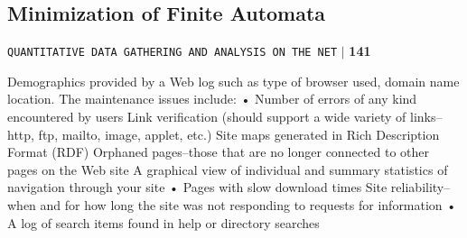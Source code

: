 \documentclass[a4,9pt]{beamer}
\begin{document}
\begin{frame}
\section*{Minimization of Finite Automata}
\begin{flushright}
 \texttt{QUANTITATIVE DATA GATHERING AND ANALYSIS ON THE NET} \hspace*{0.1cm}\textbf{$|$} \hspace*{0.1cm} \textbf{141}\hspace*{0.1cm}
\end{flushright}
\vspace*{1cm}

Demographics provided by a Web log such as type of browser used, domain name location.
The maintenance issues include:
• Number of errors of any kind encountered by users
Link verification (should support a wide variety of links--http, ftp, mailto, image, applet, etc.) Site maps generated in Rich Description Format (RDF) Orphaned pages--those that are no longer connected to other pages on the Web site A graphical view of individual and summary statistics of navigation through your
site • Pages with slow download times
Site reliability--when and for how long the site was not responding to requests
for information • A log of search items found in help or directory searches

\end{frame}
\end{document}
